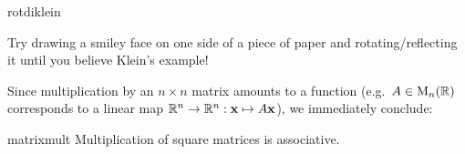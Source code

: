 \begin{defn}{}{rotdiklein}
\end{defn}


Try drawing a smiley face on one side of a piece of paper and rotating/reflecting it until you believe Klein's example! 
	
\goodbreak

Since multiplication by an $n\times n$ matrix amounts to a function (e.g.\ $A\in \mathrm{M}_n(\mathbb{R})$ corresponds to a linear map $\mathbb{R}^n\to\mathbb{R}^n:{\mathbf{x}}\mapsto A{\mathbf{x}}$), we immediately conclude:

\begin{cor}{}{matrixmult}
	Multiplication of square matrices is associative.
\end{cor}

